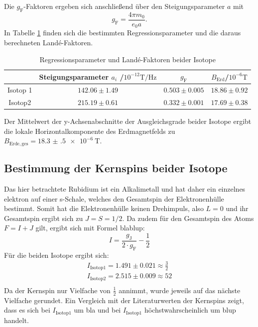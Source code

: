 Die $g_{\mathrm{F}}$-Faktoren ergeben sich anschließend über den Steigungsparameter $a$ mit
\begin{equation}
  g_{\mathrm{F}}=\frac{4\pi m_0}{e_0 a}\mathrm{.}
\end{equation}
In Tabelle \ref{tab:res1} finden sich die bestimmten Regressionsparameter und die daraus berechneten Landé-Faktoren.
\begin{table}
  \caption{Regressionsparameter und Landé-Faktoren beider Isotope}
  \label{tab:res1}
 \centering
 \begin{tabular}{cccc}
   \toprule
&Steigungsparameter $a_i$ /$ 10^{-12}\si{\tesla\per\hertz}$&$g_{\mathrm{F}}$&$B_{\mathrm{Erd}}$/$10^{-6}\si{\tesla}$\\
\midrule
Isotop 1&$142.06\pm1.49$&$0.503\pm0.005$&$18.86\pm0.92$\\
Isotop2&$215.19\pm0.61$&$0.332\pm0.001$ &$17.69\pm0.38$\\
\bottomrule
\end{tabular}
\end{table}
Der Mittelwert der y-Achsenabschnitte der Ausgleichsgrade beider Isotope ergibt die lokale Horizontalkomponente des Erdmagnetfelds zu $B_{\mathrm{Erde,ges}}=\SI{18.3(5)e-6}{\tesla}$.



\subsection{Bestimmung der Kernspins beider Isotope}
Das hier betrachtete Rubidium ist ein Alkalimetall und hat daher ein einzelnes elektron auf einer s-Schale, welches den Gesamtspin der Elektronenhülle bestimmt. Somit hat die Elektronenhülle keinen Drehimpuls, also $L=0$ und ihr Gesamtspin ergibt sich zu $J=S=1/2$. Da zudem für den Gesamtspin des Atoms $F=I+J$ gilt, ergibt sich mit Formel blablup:
\begin{equation}
I=\frac{g_{\mathrm{J}}}{2\cdot g_{\mathrm{F}}}-\frac{1}{2}
\end{equation}
Für die beiden Isotope ergibt sich:
\begin{gather*}
  I_{\mathrm{Isotop 1}}=1.491\pm0.021\approx\frac{3}{2}\\
  I_{\mathrm{Isotop 2}}=2.515\pm0.009\approx{5}{2}\\
\end{gather*}
Da der Kernspin nur Vielfache von $\frac{1}{2}$ annimmt, wurde jeweils auf das nächste Vielfache gerundet.
Ein Vergleich mit der Literaturwerten der Kernspins zeigt, dass es sich bei $I_{\mathrm{Isotop 1}}$ um bla und bei $I_{\mathrm{Isotop 1}}$ höchstwahrscheinlich um blup handelt.

